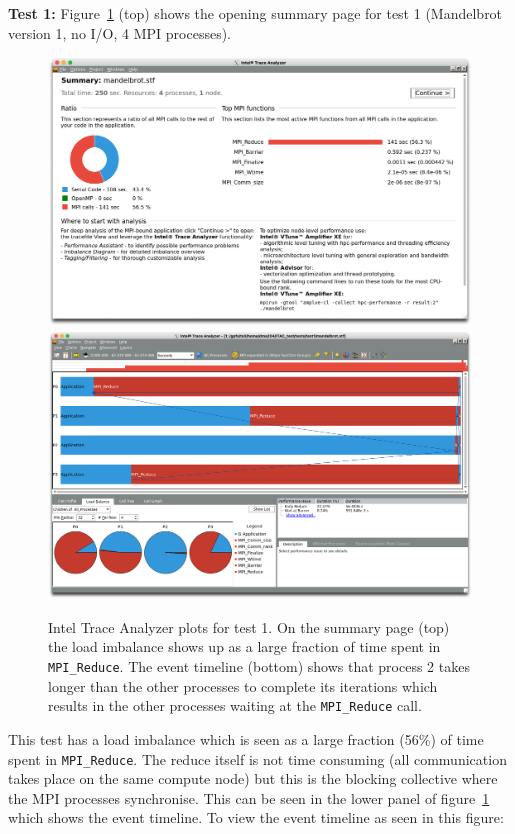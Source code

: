 \documentclass[a4paper,titlepage]{article}
\begin{document}
\noindent
\textbf{Test 1:} 
Figure~\ref{fig:test1_ITAC_summary} (top) shows the opening summary page for test 1 (Mandelbrot version 1, no I/O, 4 MPI processes).
\begin{figure}[htbp]
\begin{center}
\includegraphics[scale=0.3]{figures/test1_summary}
\includegraphics[scale=0.3]{figures/test1_eventTimeline}
\caption{Intel Trace Analyzer plots for test 1. On the summary page (top) the load imbalance shows up as a large fraction of time spent in \texttt{MPI\_Reduce}. The event timeline (bottom) shows that process 2 takes longer than the other processes to complete its iterations which results in the other processes waiting at the \texttt{MPI\_Reduce} call.}
\label{fig:test1_ITAC_summary}
\end{center}
\end{figure}
This test has a load imbalance which is seen as a large fraction (56\%) of time spent in \texttt{MPI\_Reduce}. The reduce itself is not time consuming (all communication takes place on the same compute node) but this is the blocking collective where the MPI processes synchronise. This can be seen in the lower panel of figure~\ref{fig:test1_ITAC_summary} which shows the event timeline. To view the event timeline as seen in this figure:
\end{document}
